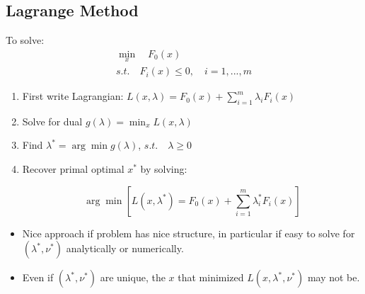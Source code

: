 \subsection{Lagrange Method}
To solve:
\begin{align*}
	\min_x\quad F_0(x)\\
	s.t. \quad F_i(x) \leq 0,\quad i = 1,...,m
\end{align*}

\begin{enumerate}
	\item First write Lagrangian: $L(x, \lambda) = F_0(x) + \sum^m_{i=1}\lambda_iF_i(x)$
	
	\item Solve for dual $g(\lambda) = \min_{x} L(x, \lambda)$
	
	\item Find $\lambda^* = \arg\min g(\lambda)$, $s.t. \quad \lambda \geq 0$
	
	\item Recover primal optimal $x^*$ by solving:
	
	\begin{equation*}
		\arg\min[L(x, \lambda^*) = F_0(x) + \sum^m_{i=1}\lambda_i^*F_i(x)]
	\end{equation*}
\end{enumerate}

\begin{itemize}
	\item Nice approach if problem has nice structure, in particular if easy to solve for $(\lambda^*, \nu^*)$ analytically or numerically. 
	
	\item Even if $(\lambda^*, \nu^*)$ are unique, the $x$ that minimized $L(x, \lambda^*, \nu^*)$ may not be.
\end{itemize}



